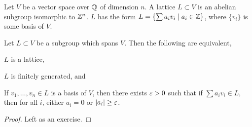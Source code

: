 \begin{definition}
    Let $V$ be a vector space over $\mathbb Q$ of dimension $n$. A lattice $L \subset V$ is an abelian subgroup isomorphic to $\mathbb Z^n$. $L$ has the form $L = \{\sum a_iv_i \mid a_i \in \mathbb Z\}$, where $\{v_i\}$ is some basis of $V$.
\end{definition}
\begin{lemma}
    Let $L \subset V$ be a subgroup which spans $V$. Then the following are equivalent, \begin{parlist} \item $L$ is a lattice, \item $L$ is finitely generated, and \item If $v_1, \dots, v_n \in L$ is a basis of $V$, then there exists $\varepsilon > 0$ such that if $\sum a_i v_i \in L$, then for all $i$, either $a_i = 0$ or $\left\lvert a_i \right\rvert \geq \varepsilon$. \end{parlist}
\end{lemma}
\begin{proof}
    Left as an exercise.
\end{proof}

